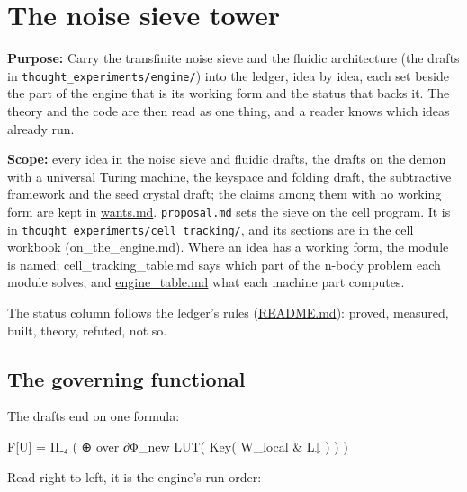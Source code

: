\chapter{\texorpdfstring{The noise sieve tower}{The noise sieve tower}}
\label{chap:noise-sieve-tower}

\textbf{Purpose:} Carry the transfinite noise sieve and the fluidic architecture (the drafts in \texttt{thought\_\allowbreak{}experiments/\allowbreak{}engine/\allowbreak{}}) into the ledger, idea by idea, each set beside the part of the engine that is its working form and the status that backs it. The theory and the code are then read as one thing, and a reader knows which ideas already run.

\textbf{Scope:} every idea in the noise sieve and fluidic drafts, the drafts on the demon with a universal Turing machine, the keyspace and folding draft, the subtractive framework and the seed crystal draft; the claims among them with no working form are kept in \hyperref[chap:wants]{wants.md}. \texttt{proposal.\allowbreak{}md} sets the sieve on the cell program. It is in \texttt{thought\_\allowbreak{}experiments/\allowbreak{}cell\_\allowbreak{}tracking/\allowbreak{}}, and its sections are in the cell workbook (on\_\allowbreak{}the\_\allowbreak{}engine.md). Where an idea has a working form, the module is named; cell\_\allowbreak{}tracking\_\allowbreak{}table.md says which part of the n-body problem each module solves, and \hyperref[chap:engine-table]{engine\_\allowbreak{}table.md} what each machine part computes.

The status column follows the ledger's rules (\hyperref[chap:readme]{README.md}): proved, measured, built, theory, refuted, not so.

\section{\texorpdfstring{The governing functional}{The governing functional}}

The drafts end on one formula:

F[U] = Π₋₄ ( ⊕ over ∂Φ\_\allowbreak{}new  LUT( Key( W\_\allowbreak{}local \& L↓ ) ) )

Read right to left, it is the engine's run order:


